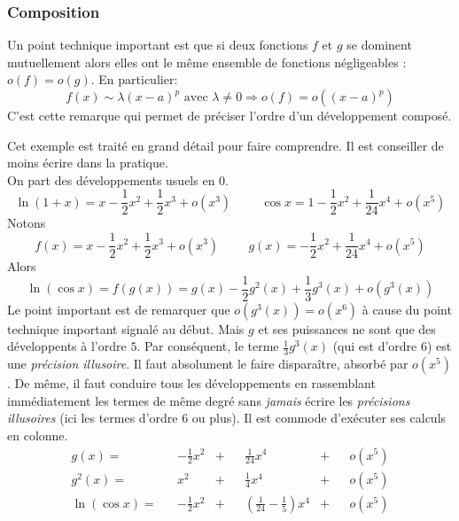 \subsubsection{Composition}
Un point technique important est que si deux fonctions $f$ et $g$ se dominent mutuellement alors elles ont le même ensemble de fonctions négligeables : $o(f)=o(g)$. En particulier:
\begin{displaymath}
 f(x) \sim \lambda (x-a)^p \text{ avec } \lambda\neq 0 \Rightarrow o(f)=o((x - a)^p) 
\end{displaymath}
C'est cette remarque qui permet de préciser l'ordre d'un développement composé.
\begin{exple}
 Cet exemple est traité en grand détail pour faire comprendre. Il est conseiller de moins écrire dans la pratique.\\
 On part des développements usuels en $0$.
\begin{displaymath}
 \ln(1+x)=x-\frac{1}{2}x^2+\frac{1}{2}x^3+o(x^3)\hspace{1cm} \cos x=1 -\frac{1}{2}x^2+\frac{1}{24}x^4+o(x^5)
\end{displaymath}
Notons
\begin{displaymath}
 f(x)=x-\frac{1}{2}x^2+\frac{1}{2}x^3+o(x^3)\hspace{1cm} g(x)= -\frac{1}{2}x^2+\frac{1}{24}x^4+o(x^5)
\end{displaymath}
Alors
\begin{displaymath}
 \ln(\cos x) = f(g(x))
= g(x)-\frac{1}{2}g^2(x)+\frac{1}{3}g^3(x)+o(g^3(x))
\end{displaymath}
Le point important est de remarquer que $o(g^3(x))=o(x^6)$ à cause du point technique important signalé au début. Mais $g$ et ses puissances ne sont que des développents à l'ordre $5$.  Par conséquent, le terme $\frac{1}{3}g^3(x)$ (qui est d'ordre $6$) est une \emph{précision illusoire}. Il faut absolument le faire disparaître, absorbé par $o(x^5)$. De même, il faut conduire tous les développements en rassemblant immédiatement les termes de même degré sans \emph{jamais} écrire les \emph{précisions illusoires} (ici les termes d'ordre $6$ ou plus). Il est commode d'exécuter ses calculs en colonne.
\begin{align*}
 g(x)       =& &-\frac{1}{2}x^2 &+& &\frac{1}{24}x^4 &+& &o(x^5) \\
 g^2(x)     =&           &x^2 &+&   &\frac{1}{4}x^4 &+& &o(x^5) \\
\ln(\cos x) =& &-\frac{1}{2}x^2 &+& &\left(\frac{1}{24}-\frac{1}{5}\right)x^4 &+& &o(x^5) 
\end{align*}
\end{exple}
 

